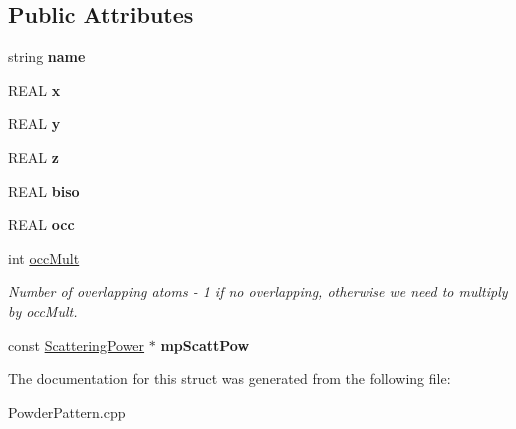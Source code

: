 \subsection*{Public Attributes}
\begin{DoxyCompactItemize}
\item 
\mbox{\label{struct_obj_cryst_1_1export_atom_a029123b0b4f0eea173246e2abac299ba}} 
string {\bfseries name}
\item 
\mbox{\label{struct_obj_cryst_1_1export_atom_a0982604befc717f6feb2b5ef5f4f1ef7}} 
R\+E\+AL {\bfseries x}
\item 
\mbox{\label{struct_obj_cryst_1_1export_atom_ad98770498dfce2427f92fe05002bc258}} 
R\+E\+AL {\bfseries y}
\item 
\mbox{\label{struct_obj_cryst_1_1export_atom_af9d6c5ea877002824bc8fef7798483c9}} 
R\+E\+AL {\bfseries z}
\item 
\mbox{\label{struct_obj_cryst_1_1export_atom_a858427f629ec8051f68e3a057df77ca4}} 
R\+E\+AL {\bfseries biso}
\item 
\mbox{\label{struct_obj_cryst_1_1export_atom_a772139ab60d13072f5d20f074f32c9ca}} 
R\+E\+AL {\bfseries occ}
\item 
\mbox{\label{struct_obj_cryst_1_1export_atom_a214354bc405c7dfcae8366287a8d660e}} 
int \mbox{\hyperlink{struct_obj_cryst_1_1export_atom_a214354bc405c7dfcae8366287a8d660e}{occ\+Mult}}
\begin{DoxyCompactList}\small\item\em Number of overlapping atoms -\/ 1 if no overlapping, otherwise we need to multiply by occ\+Mult. \end{DoxyCompactList}\item 
\mbox{\label{struct_obj_cryst_1_1export_atom_a685f731c2a0b6d5969c68843fee1804c}} 
const \mbox{\hyperlink{class_obj_cryst_1_1_scattering_power}{Scattering\+Power}} $\ast$ {\bfseries mp\+Scatt\+Pow}
\end{DoxyCompactItemize}


The documentation for this struct was generated from the following file\+:\begin{DoxyCompactItemize}
\item 
Powder\+Pattern.\+cpp\end{DoxyCompactItemize}
